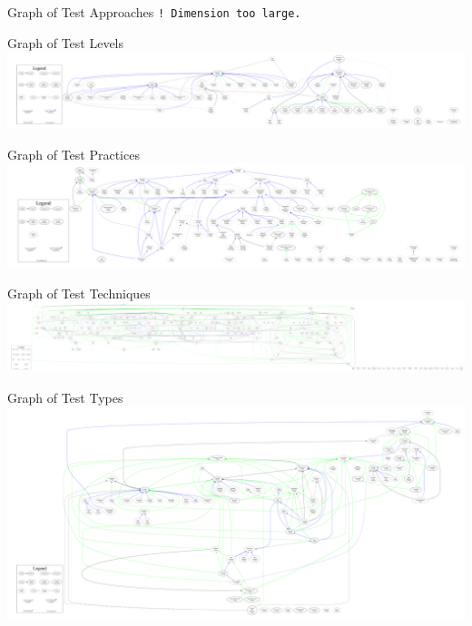 \documentclass{beamer}
\begin{document}
\begin{frame}{Graph of Test Approaches}
    \pause \large \centering \texttt{! Dimension too large.}
\end{frame}

\begin{frame}{Graph of Test Levels}
    \includegraphics[width=\textwidth]{assets/graphs/levelGraph.pdf}
\end{frame}

\begin{frame}{Graph of Test Practices}
    \includegraphics[width=\textwidth]{assets/graphs/practiceGraph.pdf}
\end{frame}

\begin{frame}{Graph of Test Techniques}
    \includegraphics[width=\textwidth]{assets/graphs/techniqueGraph.pdf}
\end{frame}

\begin{frame}{Graph of Test Types}
    \includegraphics[width=\textwidth]{assets/graphs/typeGraph.pdf}
\end{frame}
\end{document}
